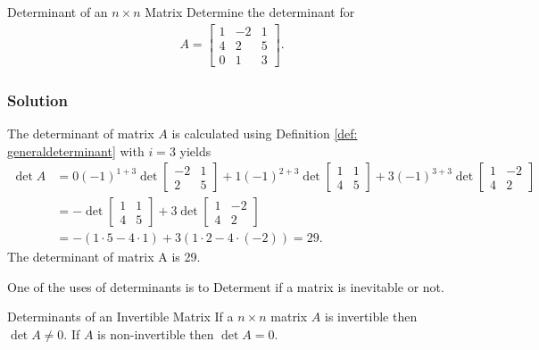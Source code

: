 \begin{example}{Determinant of an $n\times n$ Matrix}
Determine the determinant for
    \begin{align*}
        A=\begin{bmatrix}
           1 & -2 & 1\\
           4 & 2 & 5\\
           0 & 1 & 3
        \end{bmatrix}.
    \end{align*}
    \subsubsection{Solution}
    The determinant of matrix $A$ is calculated using Definition \ref{def: generaldeterminant} with $i=3$ yields
    \begin{align*}
        \det A &= 0(-1)^{1+3} \det
        \begin{bmatrix}
           -2 & 1\\
           2 & 5
        \end{bmatrix}
        +1(-1)^{2+3}\det 
        \begin{bmatrix}
           1 & 1\\
           4 & 5
        \end{bmatrix}
        +3(-1)^{3+3}\det 
        \begin{bmatrix}
           1 & -2\\
           4 & 2
        \end{bmatrix}\\
        &=
        - \det 
        \begin{bmatrix}
           1 & 1\\
           4 & 5
        \end{bmatrix}
        +3 \det 
        \begin{bmatrix}
           1 & -2\\
           4 & 2
        \end{bmatrix}\\
        &=-(1\cdot5-4\cdot1)+3(1\cdot2-4\cdot(-2))=29.
    \end{align*}
    The determinant of matrix A is 29. 
\end{example}
One of the uses of determinants is to Determent if a matrix is inevitable or not.
\begin{theorem}{Determinants of an Invertible Matrix}
    If a $n\times n$ matrix $A$ is invertible then $\det A \neq 0$. If $A$ is non-invertible then $\det A = 0$.
    \cite[214]{LiAl}
    \label{theo: det_intvertible_matrix}
\end{theorem}
